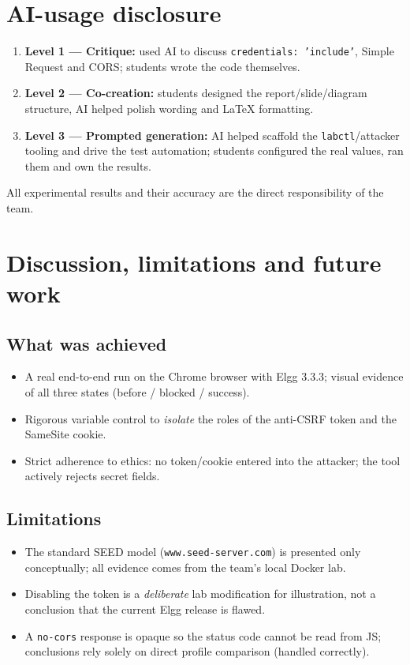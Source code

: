 \documentclass[11pt,a4paper]{article}
\begin{document}
\section{AI-usage disclosure}
\begin{enumerate}
  \item \textbf{Level 1 — Critique:} used AI to discuss \texttt{credentials: 'include'}, Simple Request and CORS; students wrote the code themselves.
  \item \textbf{Level 2 — Co-creation:} students designed the report/slide/diagram structure, AI helped polish wording and LaTeX formatting.
  \item \textbf{Level 3 — Prompted generation:} AI helped scaffold the \texttt{labctl}/attacker tooling and drive the test automation; students configured the real values, ran them and own the results.
\end{enumerate}
\noindent All experimental results and their accuracy are the direct responsibility of the team.

\section{Discussion, limitations and future work}
\subsection{What was achieved}
\begin{itemize}
  \item A real end-to-end run on the Chrome browser with Elgg 3.3.3; visual evidence of all three states (before / blocked / success).
  \item Rigorous variable control to \emph{isolate} the roles of the anti-CSRF token and the SameSite cookie.
  \item Strict adherence to ethics: no token/cookie entered into the attacker; the tool actively rejects secret fields.
\end{itemize}
\subsection{Limitations}
\begin{itemize}
  \item The standard SEED model (\texttt{www.seed-server.com}) is presented only conceptually; all evidence comes from the team's local Docker lab.
  \item Disabling the token is a \emph{deliberate} lab modification for illustration, not a conclusion that the current Elgg release is flawed.
  \item A \texttt{no-cors} response is opaque so the status code cannot be read from JS; conclusions rely solely on direct profile comparison (handled correctly).
\end{itemize}
\end{document}
